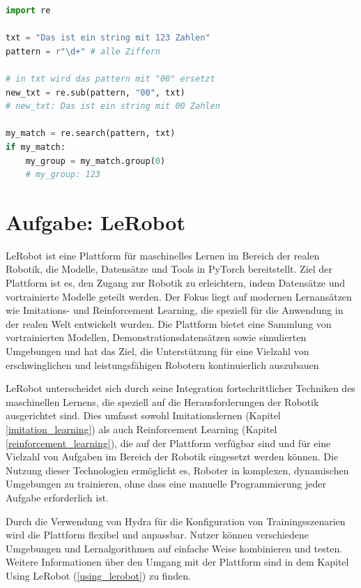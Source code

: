 \documentclass[a4paper, 12pt]{article}
\begin{document}
\begin{lstlisting}[language=Python, caption=Beispiel für regex Syntax:]
import re

txt = "Das ist ein string mit 123 Zahlen"
pattern = r"\d+" # alle Ziffern

# in txt wird das pattern mit "00" ersetzt
new_txt = re.sub(pattern, "00", txt)
# new_txt: Das ist ein string mit 00 Zahlen

my_match = re.search(pattern, txt)
if my_match:
	my_group = my_match.group(0)
	# my_group: 123
\end{lstlisting} %

\section{Aufgabe: LeRobot} \label{lerobot}
LeRobot ist eine Plattform für maschinelles Lernen im Bereich der realen Robotik, die Modelle, Datensätze und Tools in PyTorch bereitstellt. Ziel der Plattform ist es, den Zugang zur Robotik zu erleichtern, indem Datensätze und vortrainierte Modelle geteilt werden. Der Fokus liegt auf modernen Lernansätzen wie Imitations- und Reinforcement Learning, die speziell für die Anwendung in der realen Welt entwickelt wurden. Die Plattform bietet eine Sammlung von vortrainierten Modellen, Demonstrationsdatensätzen sowie simulierten Umgebungen und hat das Ziel, die Unterstützung für eine Vielzahl von erschwinglichen und leistungsfähigen Robotern kontinuierlich auszubauen 

LeRobot unterscheidet sich durch seine Integration fortschrittlicher Techniken des maschinellen Lernens, die speziell auf die Herausforderungen der Robotik ausgerichtet sind. Dies umfasst sowohl Imitationslernen (Kapitel \ref{imitation_learning}) als auch  Reinforcement Learning (Kapitel \ref{reinforcement_learning}), die auf der Plattform verfügbar sind und für eine Vielzahl von Aufgaben im Bereich der Robotik eingesetzt werden können. Die Nutzung dieser Technologien ermöglicht es, Roboter in komplexen, dynamischen Umgebungen zu trainieren, ohne dass eine manuelle Programmierung jeder Aufgabe erforderlich ist. 

Durch die Verwendung von Hydra für die Konfiguration von Trainingsszenarien wird die Plattform flexibel und anpassbar. Nutzer können verschiedene Umgebungen und Lernalgorithmen auf einfache Weise kombinieren und testen. Weitere Informationen über den Umgang mit der Plattform sind in dem Kapitel Using LeRobot (\ref{using_lerobot}) zu finden.
\end{document}
